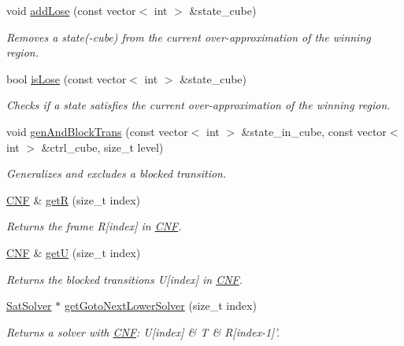\begin{DoxyCompactItemize}
void \hyperlink{classIFM13Synth_adf319a6748eda4aa29017a561752b262}{add\-Lose} (const vector$<$ int $>$ \&state\-\_\-cube)
\begin{DoxyCompactList}\small\item\em Removes a state(-\/cube) from the current over-\/approximation of the winning region. \end{DoxyCompactList}\item 
bool \hyperlink{classIFM13Synth_aca85bf07810f6c8cc3c3125895daf56f}{is\-Lose} (const vector$<$ int $>$ \&state\-\_\-cube)
\begin{DoxyCompactList}\small\item\em Checks if a state satisfies the current over-\/approximation of the winning region. \end{DoxyCompactList}\item 
void \hyperlink{classIFM13Synth_a1edccb04c096bb68a6fb2a8245f3129b}{gen\-And\-Block\-Trans} (const vector$<$ int $>$ \&state\-\_\-in\-\_\-cube, const vector$<$ int $>$ \&ctrl\-\_\-cube, size\-\_\-t level)
\begin{DoxyCompactList}\small\item\em Generalizes and excludes a blocked transition. \end{DoxyCompactList}\item 
\hyperlink{classCNF}{C\-N\-F} \& \hyperlink{classIFM13Synth_a050f0c3c5089ef6c5f793878bd60abc9}{get\-R} (size\-\_\-t index)
\begin{DoxyCompactList}\small\item\em Returns the frame R\mbox{[}index\mbox{]} in \hyperlink{classCNF}{C\-N\-F}. \end{DoxyCompactList}\item 
\hyperlink{classCNF}{C\-N\-F} \& \hyperlink{classIFM13Synth_a396e520b9db59b73a46a2315ee3123b4}{get\-U} (size\-\_\-t index)
\begin{DoxyCompactList}\small\item\em Returns the blocked transitions U\mbox{[}index\mbox{]} in \hyperlink{classCNF}{C\-N\-F}. \end{DoxyCompactList}\item 
\hyperlink{classSatSolver}{Sat\-Solver} $\ast$ \hyperlink{classIFM13Synth_ae97c0b41568cf25e163ab9b309f0dcaa}{get\-Goto\-Next\-Lower\-Solver} (size\-\_\-t index)
\begin{DoxyCompactList}\small\item\em Returns a solver with \hyperlink{classCNF}{C\-N\-F}\-: U\mbox{[}index\mbox{]} \& T \& R\mbox{[}index-\/1\mbox{]}'. \end{DoxyCompactList}\item 

\end{DoxyCompactItemize}
